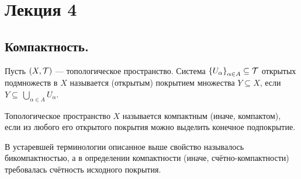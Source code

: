 \section{Лекция 4}

\subsection{Компактность.}

\begin{definition}
    Пусть $(X, \mathcal{T})$ --- топологическое пространство. Система $\left\{U_{\alpha}\right\}_{\alpha \in A} \subseteq \mathcal{T}$ открытых подмножеств в $X$ называется (открытым) покрытием множества $Y \subseteq X$, если $Y \subseteq \, \bigcup_{\alpha \in A} U_{\alpha}$.
\end{definition}

\begin{definition}
    Топологическое пространство $X$ называется компактным (иначе, компактом), если из любого его открытого покрытия можно выделить конечное подпокрытие.
\end{definition}

\begin{nota_bene}
    В устаревшей терминологии описанное выше свойство называлось бикомпактностью, а в определении компактности (иначе, счётно-компактности) требовалась счётность исходного покрытия.
\end{nota_bene}

